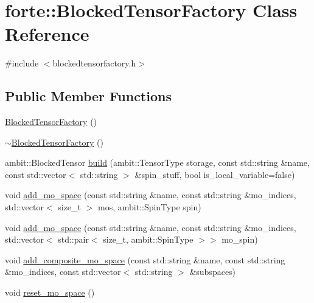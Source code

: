 \hypertarget{classforte_1_1_blocked_tensor_factory}{}\section{forte\+:\+:Blocked\+Tensor\+Factory Class Reference}
\label{classforte_1_1_blocked_tensor_factory}


{\ttfamily \#include $<$blockedtensorfactory.\+h$>$}

\subsection*{Public Member Functions}
\begin{DoxyCompactItemize}
\item 
\mbox{\hyperlink{classforte_1_1_blocked_tensor_factory_a4d918bbb012371d84c4c6b09a49137cf}{Blocked\+Tensor\+Factory}} ()
\item 
\mbox{\hyperlink{classforte_1_1_blocked_tensor_factory_a7e8f4846afdf3a558725eecee7ebb7ed}{$\sim$\+Blocked\+Tensor\+Factory}} ()
\item 
ambit\+::\+Blocked\+Tensor \mbox{\hyperlink{classforte_1_1_blocked_tensor_factory_afd101ce291ce4d6c5068edb9afde081b}{build}} (ambit\+::\+Tensor\+Type storage, const std\+::string \&name, const std\+::vector$<$ std\+::string $>$ \&spin\+\_\+stuff, bool is\+\_\+local\+\_\+variable=false)
\item 
void \mbox{\hyperlink{classforte_1_1_blocked_tensor_factory_ab9bfd3f8d82a640bf816d841222396a8}{add\+\_\+mo\+\_\+space}} (const std\+::string \&name, const std\+::string \&mo\+\_\+indices, std\+::vector$<$ size\+\_\+t $>$ mos, ambit\+::\+Spin\+Type spin)
\item 
void \mbox{\hyperlink{classforte_1_1_blocked_tensor_factory_a774396c3920f7e306bef84e35b15eaf0}{add\+\_\+mo\+\_\+space}} (const std\+::string \&name, const std\+::string \&mo\+\_\+indices, std\+::vector$<$ std\+::pair$<$ size\+\_\+t, ambit\+::\+Spin\+Type $>$$>$ mo\+\_\+spin)
\item 
void \mbox{\hyperlink{classforte_1_1_blocked_tensor_factory_aa0e2f489066c8636c897b5b15a48b438}{add\+\_\+composite\+\_\+mo\+\_\+space}} (const std\+::string \&name, const std\+::string \&mo\+\_\+indices, const std\+::vector$<$ std\+::string $>$ \&subspaces)
\item 
void \mbox{\hyperlink{classforte_1_1_blocked_tensor_factory_aab5575350323f1f7834f181621f7ca63}{reset\+\_\+mo\+\_\+space}} ()
\item 
$$
\end{DoxyCompactItemize}
